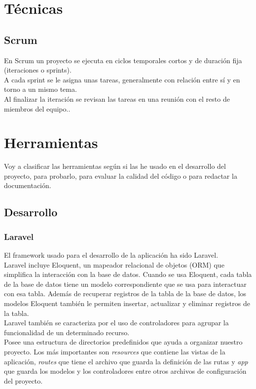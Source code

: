 \section{Técnicas}
\subsection{Scrum}
En Scrum un proyecto se ejecuta en ciclos temporales cortos y de duración fija (iteraciones o sprints).\cite{scrum:definicion}\\
A cada sprint se le asigna unas tareas, generalmente con relación entre sí y en torno a un mismo tema.\\ 
Al finalizar la iteración se revisan las tareas en una reunión con el resto de miembros del equipo.. 
\section{Herramientas}
Voy a clasificar las herramientas según si las he usado en el desarrollo del proyecto, para probarlo, para evaluar la calidad del código o para redactar la documentación.  
\subsection{Desarrollo}
\subsubsection{Laravel}
El framework usado para el desarrollo de la aplicación ha sido Laravel.\\
Laravel incluye Eloquent, un mapeador relacional de objetos (ORM) que simplifica la interacción con la base de datos. Cuando se usa Eloquent, cada tabla de la base de datos tiene un modelo correspondiente que se usa para interactuar con esa tabla. Además de recuperar registros de la tabla de la base de datos, los modelos Eloquent también le permiten insertar, actualizar y eliminar registros de la tabla.\cite{Laravel:modelos}\\
Laravel también se caracteriza por el uso de controladores para agrupar la funcionalidad de un determinado recurso.\cite{Laravel:controladores}\\
Posee una estructura de directorios predefinidos que ayuda a organizar nuestro proyecto. Los más importantes son \textit{resources} que contiene las vistas de la aplicación, \textit{routes} que tiene el archivo que guarda la definición de las rutas y \textit{app} que guarda los modelos y los controladores entre otros archivos de configuración del proyecto.\\

